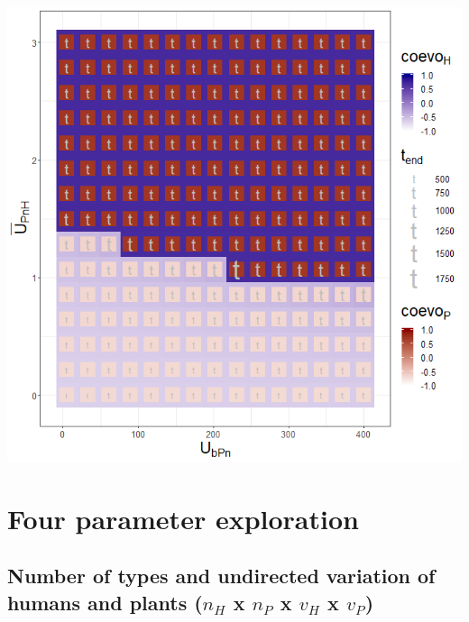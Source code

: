 \documentclass[]{book}
\begin{document}
\includegraphics[width=1\linewidth]{plots/3_twoPar-U.bPn-mU.PnH_plot}

\newpage

\hypertarget{four-parameter-exploration}{%
\chapter{Four parameter exploration}\label{four-parameter-exploration}}

\newpage

\hypertarget{number-of-types-and-undirected-variation-of-humans-and-plants-n_h-x-n_p-x-v_h-x-v_p}{%
\section{\texorpdfstring{Number of types and undirected variation of humans and plants (\(n_{H}\) x \(n_{P}\) x \(v_{H}\) x \(v_{P}\))}{Number of types and undirected variation of humans and plants (n\_\{H\} x n\_\{P\} x v\_\{H\} x v\_\{P\})}}\label{number-of-types-and-undirected-variation-of-humans-and-plants-n_h-x-n_p-x-v_h-x-v_p}}

\end{document}
